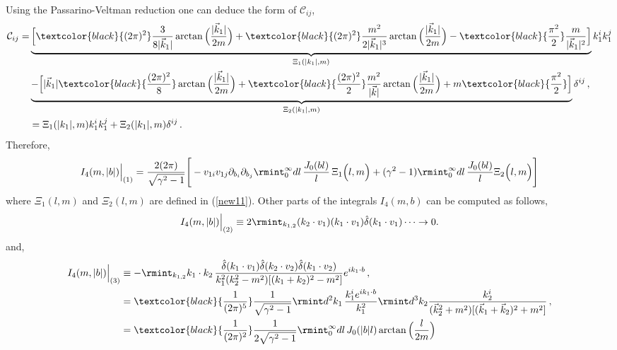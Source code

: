 Using the Passarino-Veltman reduction one can deduce the form of $\mathcal{C}_{ij}$,
\begin{align}
    \begin{split}
\mathcal{C}_{ij}=&\underbrace{\Big[\textcolor{black}{(2\pi)^2}\frac{3}{8 |\vec k_1|}\arctan\Big(\frac{|\vec k_1|}{2m}\Big)+\textcolor{black}{(2\pi)^2}\frac{m^2}{2 |\vec k_1|^3}\arctan\Big(\frac{|\vec k_1|}{2m}\Big)-\textcolor{black}{\frac{\pi^2}{2}}\frac{m}{|\vec k_1|^2}\Big]}_{\Xi_1(|k_1|,m)}k_1^i k_1^j\\ &
       \underbrace{- \Big[|\vec k_1|\textcolor{black}{\frac{(2\pi)^2}{8}}\arctan\Big(\frac{|\vec k_1|}{2m}\Big)+\textcolor{black}{\frac{(2\pi)^2}{2}}\frac{m^2}{ |\vec k|}\arctan\Big(\frac{|\vec k_1|}{2m}\Big)+m\textcolor{black}{\frac{\pi^2}{2}}\Big]}_{\Xi_2 (|k_1|,m)}\delta^{ij}\,,\\ &
={\Xi}_1(|k_1|,m)k_1^i k_1^j+{\Xi}_{2}(|k_1|,m)\delta^{ij}\,.  \label{new11}
    \end{split}
\end{align}
Therefore,
\begin{align}
    \begin{split} \label{eq:4.35}
        I_{4}(m,|b|)\Big|_{(1)}=\frac{2(2\pi)}{\sqrt{\gamma^2-1}}\Bigg[-v_{1i}v_{1j}\partial_{b_i}\partial_{b_j}\rmint_{0}^{\infty}dl\,\frac{J_{0}(bl)}{l}\,{\Xi}_1\Big(l,m\Big)+(\gamma^2-1)\rmint_{0}^\infty dl\,\frac{J_{0}(bl)}{l}{\Xi}_2\Big(l,m\Big)\Bigg]
    \end{split}
\end{align}
where ${\Xi}_1(l,m)$ and ${\Xi}_2(l,m)$ are defined in (\ref{new11}). 
Other parts of the integrals $I_4(m,b)$ can be computed as follows,
\begin{align}
    \begin{split}
        I_{4}(m,|b|)\Big|_{(2)}\equiv 2\rmint_{k_{1,2}}(k_2\cdot v_1)(k_1\cdot v_1)\hat\delta(k_1\cdot v_1)\cdots \rightarrow 0.
    \end{split}
\end{align}
and,
\begin{align}
    \begin{split}
        I_{4}(m,|b|)\Big|_{(3)}&\equiv- \rmint_{k_{1,2}}k_1\cdot k_2\,\frac{\hat\delta(k_1\cdot v_1) \hat\delta(k_2\cdot v_2)\hat\delta(k_1\cdot v_2)}{k_1^2(k_2^2-m^2)[(k_1+k_2)^2-m^2]}e^{i k_1\cdot b}\,,\\ &
        =\textcolor{black}{\frac{1}{(2\pi)^5}}\frac{1}{\sqrt{\gamma^2-1}}\rmint d^2 k_1 \,\frac{k_1^i e^{ik_1\cdot b}}{k_1^2}\rmint d^3 k_2 \frac{k_2^i}{(\vec k_2^2+m^2)[(\vec k_1+\vec k_2)^2+m^2]}\,,\\ &
        =\textcolor{black}{\frac{1}{(2\pi)^2}}\frac{1}{2\sqrt{\gamma^2-1}}\rmint_{0}^{\infty} dl \,J_{0}(|b|l)\arctan\Big(\frac{l}{2m}\Big) \label{eq:4.37}
    \end{split}
\end{align}
